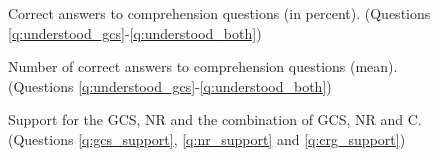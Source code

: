 \begin{figure}[h!]
    \caption[Comprehension]{Correct answers to comprehension questions (in percent). (Questions \ref{q:understood_gcs}-\ref{q:understood_both})}\label{fig:understood_each}
\end{figure}

\begin{figure}[h!]
    \caption[Comprehension score]{Number of correct answers to comprehension questions (mean). (Questions \ref{q:understood_gcs}-\ref{q:understood_both})}\label{fig:understood_score}
\end{figure}

\begin{figure}[h!]
    \caption[Support for the Global Climate Scheme]{Support for the GCS, NR and the combination of GCS, NR and C. (Questions \ref{q:gcs_support}, \ref{q:nr_support} and \ref{q:crg_support})}\label{fig:support_binary}
\end{figure}



